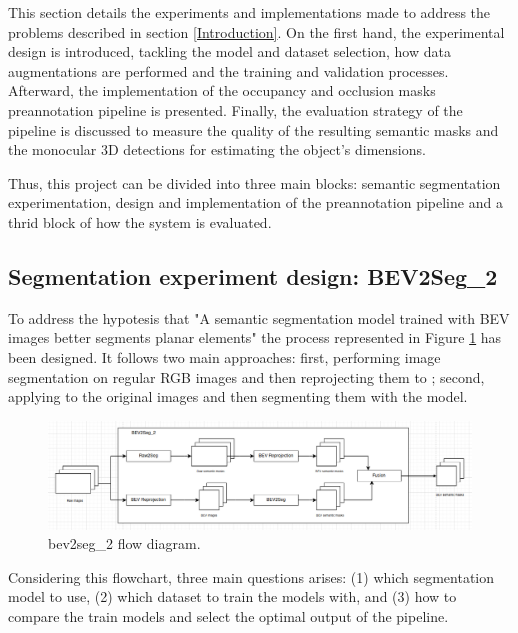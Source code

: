 
This section details the experiments and implementations made to address the problems described in section \ref{Introduction}. On the first hand, the experimental design is introduced, tackling the model and dataset selection, how data augmentations are performed and the training and validation processes. Afterward, the implementation of the occupancy and occlusion masks preannotation pipeline is presented. Finally, the evaluation strategy of the pipeline is discussed to measure the quality of the resulting semantic masks and the monocular 3D detections for estimating the object's dimensions.

Thus, this project can be divided into three main blocks:  semantic segmentation experimentation, design and implementation of the preannotation pipeline and a thrid block of how the system is evaluated.

\subsection{Segmentation experiment design: BEV2Seg\_2}
\label{bev2seg_2}

To address the hypotesis that "A semantic segmentation model trained with BEV images better segments planar elements" the process represented in Figure \ref{fig:beg2seg_2_flow} has been designed. It follows two main approaches: first, performing image segmentation on regular RGB images and then reprojecting them to ; second, applying  to the original images and then segmenting them with the model.

\begin{figure}[h!]
    \centering
    \includegraphics[width=\linewidth]{./images/metodology/bev2seg_2_flow.png}
    \caption{bev2seg\_2 flow diagram.}
    \label{fig:beg2seg_2_flow}
\end{figure}

Considering this flowchart, three main questions arises: (1) which segmentation model to use, (2) which dataset to train the models with, and (3) how to compare the train models and select the optimal output of the pipeline. 


